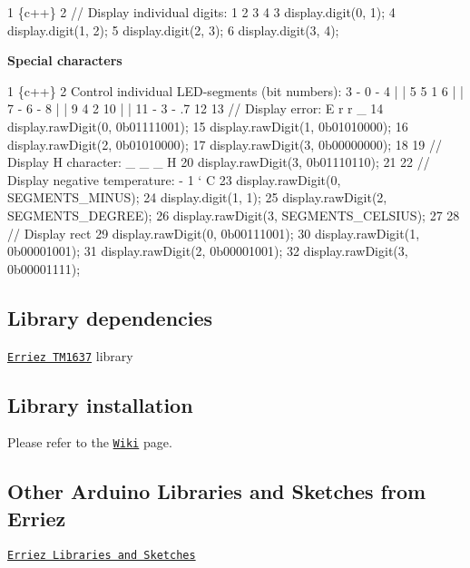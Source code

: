 \begin{DoxyCode}
1 \{c++\}
2 // Display individual digits: 1 2 3 4
3 display.digit(0, 1);
4 display.digit(1, 2);
5 display.digit(2, 3);
6 display.digit(3, 4);
\end{DoxyCode}


{\bfseries Special characters}


\begin{DoxyCode}
1 \{c++\}
2 Control individual LED-segments (bit numbers):
3    - 0 -
4    |   |
5    5   1
6    |   |
7    - 6 -
8    |   |
9    4   2
10    |   |
11    - 3 -  .7
12 
13 // Display error: E r r \_
14 display.rawDigit(0, 0b01111001);
15 display.rawDigit(1, 0b01010000);
16 display.rawDigit(2, 0b01010000);
17 display.rawDigit(3, 0b00000000);
18 
19 // Display H character: \_ \_ \_ H
20 display.rawDigit(3, 0b01110110);
21 
22 // Display negative temperature: - 1 ` C
23 display.rawDigit(0, SEGMENTS\_MINUS);
24 display.digit(1, 1);
25 display.rawDigit(2, SEGMENTS\_DEGREE);
26 display.rawDigit(3, SEGMENTS\_CELSIUS);
27 
28 // Display rect
29 display.rawDigit(0, 0b00111001);
30 display.rawDigit(1, 0b00001001);
31 display.rawDigit(2, 0b00001001);
32 display.rawDigit(3, 0b00001111);
\end{DoxyCode}


\subsection*{Library dependencies}


\begin{DoxyItemize}
\item \href{https://github.com/Erriez/ErriezTM1637}{\tt Erriez T\+M1637} library
\end{DoxyItemize}

\subsection*{Library installation}

Please refer to the \href{https://github.com/Erriez/ErriezArduinoLibrariesAndSketches/wiki}{\tt Wiki} page.

\subsection*{Other Arduino Libraries and Sketches from Erriez}


\begin{DoxyItemize}
\item \href{https://github.com/Erriez/ErriezArduinoLibrariesAndSketches}{\tt Erriez Libraries and Sketches} 
\end{DoxyItemize}